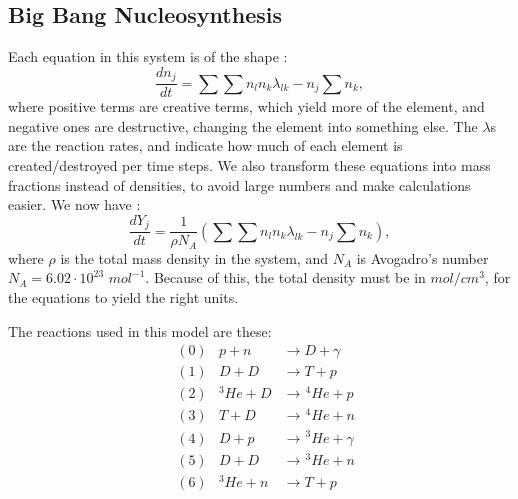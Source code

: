 \documentclass[a4paper, 12pt]{article}
\begin{document}
\subsection{Big Bang Nucleosynthesis}
\label{subsec:bigbang}
Each equation in this system is of the shape :
$$\frac{dn_j}{dt} = \sum\sum n_ln_k\lambda_{lk} - n_j\sum n_k,$$
where positive terms are creative terms, which yield more of the element, and negative ones are destructive, changing the element into something else. The $\lambda$s are the reaction rates, and indicate how much of each element is created/destroyed per time steps. We also transform these equations into mass fractions instead of densities, to avoid large numbers and make calculations easier. We now have :
$$\frac{dY_j}{dt} = \frac{1}{\rho N_A}(\sum\sum n_ln_k\lambda_{lk} - n_j\sum n_k),$$
where $\rho$ is the total mass density in the system, and $N_A$ is Avogadro's number $N_A = 6.02\cdot 10^{23}$ $mol^{-1}$. Because of this, the total density must be in $mol/cm^{3}$, for the equations to yield the right units.

The reactions used in this model are these:
\label{eq:reacts}
\begin{align*}
    &(0) &p+n &\rightarrow D+\gamma\\
    &(1) &D+D &\rightarrow T+p\\
    &(2) &^3He+D &\rightarrow \hspace{1pt}^4He+p\\
    &(3) &T+D &\rightarrow\hspace{1pt}^4He+n\\
    &(4) &D+p &\rightarrow\hspace{1pt}^3He+\gamma\\
    &(5) &D+D &\rightarrow\hspace{1pt}^3He+n\\
    &(6) &^3He+n &\rightarrow T+p\\
\end{align*}
\end{document}
